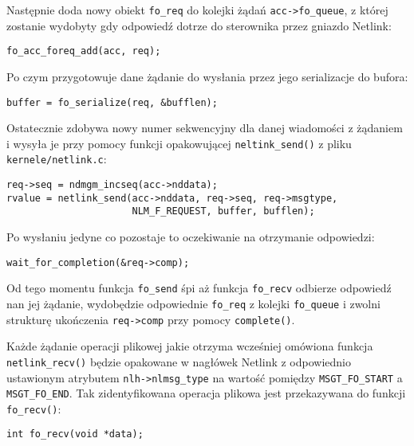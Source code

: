 Następnie doda nowy obiekt \texttt{fo\_req} do kolejki żądań
\texttt{acc-\textgreater{}fo\_queue}, z której zostanie wydobyty gdy
odpowiedź dotrze do sterownika przez gniazdo Netlink:

\begin{verbatim}
fo_acc_foreq_add(acc, req);
\end{verbatim}

Po czym przygotowuje dane żądanie do wysłania przez jego serializacje do
bufora:

\begin{verbatim}
buffer = fo_serialize(req, &bufflen);
\end{verbatim}

Ostatecznie zdobywa nowy numer sekwencyjny dla danej wiadomości z
żądaniem i wysyła je przy pomocy funkcji opakowującej
\texttt{neltink\_send()} z pliku \texttt{kernele/netlink.c}:

\begin{verbatim}
req->seq = ndmgm_incseq(acc->nddata);
rvalue = netlink_send(acc->nddata, req->seq, req->msgtype,
                      NLM_F_REQUEST, buffer, bufflen);
\end{verbatim}

Po wysłaniu jedyne co pozostaje to oczekiwanie na otrzymanie odpowiedzi:

\begin{verbatim}
wait_for_completion(&req->comp);
\end{verbatim}

Od tego momentu funkcja \texttt{fo\_send} śpi aż funkcja
\texttt{fo\_recv} odbierze odpowiedź nan jej żądanie, wydobędzie
odpowiednie \texttt{fo\_req} z kolejki \texttt{fo\_queue} i zwolni
strukturę ukończenia \texttt{req-\textgreater{}comp} przy pomocy
\texttt{complete()}.


Każde żądanie operacji plikowej jakie otrzyma wcześniej omówiona funkcja
\texttt{netlink\_recv()} będzie opakowane w nagłówek Netlink z
odpowiednio ustawionym atrybutem \texttt{nlh-\textgreater{}nlmsg\_type}
na wartość pomiędzy \texttt{MSGT\_FO\_START} a \texttt{MSGT\_FO\_END}.
Tak zidentyfikowana operacja plikowa jest przekazywana do funkcji
\texttt{fo\_recv()}:

\begin{verbatim}
int fo_recv(void *data);
\end{verbatim}

